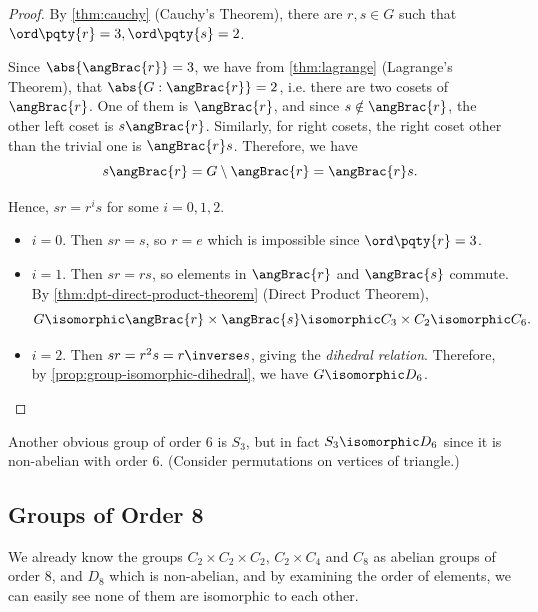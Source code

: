 \begin{proof}
    By \autoref{thm:cauchy} (Cauchy's Theorem), there are \(r, s \in G\) such that \(\ord\pqty{r} = 3, \ord\pqty{s} = 2\).

    Since \(\abs{\angBrac{r}} = 3\), we have from \autoref{thm:lagrange} (Lagrange's Theorem), that \(\abs{G : \angBrac{r}} = 2\), i.e. there are two cosets of \(\angBrac{r}\). One of them is \(\angBrac{r}\), and since \(s \notin \angBrac{r}\), the other left coset is \(s\angBrac{r}\). Similarly, for right cosets, the right coset other than the trivial one is \(\angBrac{r}s\). Therefore, we have
    \[
        s\angBrac{r} = G \setminus \angBrac{r} = \angBrac{r} s.
    \]

    Hence, \(sr = r^i s\) for some \(i = 0, 1, 2\).

    \begin{itemize}
        \item \(i = 0\). Then \(sr = s\), so \(r = e\) which is impossible since \(\ord\pqty{r} = 3\).
        \item \(i = 1\). Then \(sr = rs\), so elements in \(\angBrac{r}\) and \(\angBrac{s}\) commute. By \autoref{thm:dpt-direct-product-theorem} (Direct Product Theorem),
        \[
            G \isomorphic \angBrac{r} \times \angBrac{s} \isomorphic C_3 \times C_2 \isomorphic C_6.
        \]
        \item \(i = 2\). Then \(sr = r^2 s = r\inverse s\), giving the \emph{dihedral relation}. Therefore, by \autoref{prop:group-isomorphic-dihedral}, we have \(G \isomorphic D_6\).
    \end{itemize}
\end{proof}

\begin{remark}
    Another obvious group of order \(6\) is \(S_3\), but in fact \(S_3 \isomorphic D_6\) since it is non-abelian with order \(6\). (Consider permutations on vertices of triangle.)
\end{remark}

\subsection{Groups of Order 8}
\label{sec:groups-of-order-8}

We already know the groups \(C_2 \times C_2 \times C_2\), \(C_2 \times C_4\) and \(C_8\) as abelian groups of order 8, and \(D_8\) which is non-abelian, and by examining the order of elements, we can easily see none of them are isomorphic to each other.

